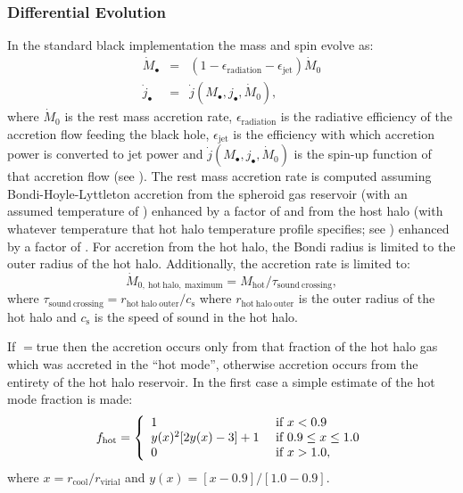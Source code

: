 \subsubsection{Differential Evolution}

In the standard black implementation the mass and spin evolve as:
\begin{eqnarray}
\dot{M}_\bullet &=& (1-\epsilon_\mathrm{radiation}-\epsilon_\mathrm{jet}) \dot{M}_0 \\
\dot{j}_\bullet &=& \dot{j}(M_\bullet,j_\bullet,\dot{M}_0),
\end{eqnarray}
where $\dot{M}_0$ is the rest mass accretion rate, $\epsilon_\mathrm{radiation}$ is the radiative efficiency of the accretion flow feeding the black hole, $\epsilon_\mathrm{jet}$ is the efficiency with which accretion power is converted to jet power and $\dot{j}(M_\bullet,j_\bullet,\dot{M}_0)$ is the spin-up function of that accretion flow (see ). The rest mass accretion rate is computed assuming Bondi-Hoyle-Lyttleton accretion from the spheroid gas reservoir (with an assumed temperature of {\normalfont \ttfamily [bondiHoyleAccretionTemperatureSpheroid]}) enhanced by a factor of {\normalfont \ttfamily [bondiHoyleAccretionEnhancementSpheroid]} and from the host halo (with whatever temperature that hot halo temperature profile specifies; see ) enhanced by a factor of {\normalfont \ttfamily [bondiHoyleAccretionEnhancementHotHalo]}. For accretion from the hot halo, the Bondi radius is limited to the outer radius of the hot halo. Additionally, the accretion rate is limited to:
\begin{equation}
 \dot{M}_\mathrm{0,~hot~halo,~maximum} = M_\mathrm{hot}/\tau_\mathrm{sound~crossing},
\end{equation}
where $\tau_\mathrm{sound~crossing}=r_\mathrm{hot~halo~outer}/c_\mathrm{s}$ where $r_\mathrm{hot~halo~outer}$ is the outer radius of the hot halo and $c_\mathrm{s}$ is the speed of sound in the hot halo.

If {\normalfont \ttfamily [bondiHoyleAccretionHotModeOnly]}$=${\normalfont \ttfamily true} then the accretion occurs only from that fraction of the hot halo gas which was accreted in the ``hot mode'', otherwise accretion 
occurs from the entirety of the hot halo reservoir. In the first case a simple estimate of the hot mode fraction is made:
\begin{equation}
f_\mathrm{hot} = \left\{ \begin{array}{ll} 1 & \hbox{ if } x < 0.9 \\ y(x)^2[2 y(x) - 3]+1  & \hbox{ if } 0.9 \le x \le 1.0 \\ 0 & \hbox{ if } x > 1.0, \end{array} \right.
\end{equation}
where $x = r_\mathrm{cool}/r_\mathrm{virial}$ and $y(x)=[x-0.9]/[1.0-0.9]$.

